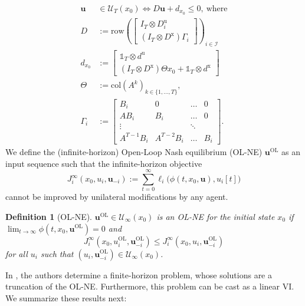 \documentclass[letterpaper, 10 pt, conference]{ieeeconf}  %
\newcommand{\mc}{\mathcal}
\newcommand{\bs}{\boldsymbol}
\newcommand{\col}{\mathrm{col}}
\newcommand{\buol}{\boldsymbol{u}^{\mathrm{OL}}}
\newcommand{\uol}{u^{\mathrm{OL}}}
\newcommand{\bu}{\boldsymbol{u}}
\newcommand{\Dx}{D^{\text{x}}}
\newcommand{\Du}{D^{\text{u}}}
\newcommand{\row}{\mathrm{row}}
\newtheorem{definition}{Definition}
\begin{document}
\begin{align}
    \bu&\in\mc U_T(x_0) \iff D\bu + d_{x_0} \leq 0, ~\text{where} \label{def-constraint1}\\ 
    D &:= 
        \row\left(\begin{bmatrix}
            I_T \otimes \Du_i \\
            (I_T\otimes\Dx)\Gamma_i
        \end{bmatrix}\right)_{i\in\mc I} \label{def-constraint2}\\ 
    d_{x_0} &:= \begin{bmatrix}
    \mathds{1}_{T} \otimes d^{\text{u}}\\
    (I_T\otimes \Dx)\Theta x_0 + \mathds{1}_{T} \otimes d^{\text{x}} \end{bmatrix}\label{def-constraint3}\\
    \Theta &:= \col(A^k)_{k\in\{1,...,T\}}, \label{def-constraint4}\\
    \Gamma_i &:= \begin{bmatrix}
            B_i & 0 & \dots & 0 \\
            A B_i & B_i & \dots & 0 \\
            \vdots &  & \ddots & \\
            A^{T-1}B_i & A^{T-2}B_i & \dots  &B_i
        \end{bmatrix}. \label{def-constraint5}
\end{align}
We define the (infinite-horizon) Open-Loop Nash equilibrium (OL-NE) $\buol$ as an input sequence such that the infinite-horizon objective
\begin{equation}
    J_i^\infty(x_0, u_i, \bs{u}_{-i}):= \sum_{t=0}^{\infty} \ell_i\big(\phi(t,x_0,\bu),u_i[t]\big)
\end{equation}
cannot be improved by unilateral modifications by any agent.
\begin{definition}[OL-NE] $\buol\in\mc{U}_{\infty}(x_0)$ is an OL-NE for the initial state $x_0$ if $\lim_{t\xrightarrow{}\infty} \phi(t,x_0,\buol)=0$ and
    \begin{equation}
        J_i^\infty(x_0, \uol_i, \buol_{-i})\leq J_i^\infty(x_0, u_i, \buol_{-i})
    \end{equation}
    for all $u_i$ such that $(u_i, \buol_{-i})\in\mc{U}_\infty(x_0)$.
\end{definition}
In \cite{benenati2024linear}, the authors determine a finite-horizon problem, whose solutions are a truncation of the OL-NE. Furthermore, this problem can be cast as a linear VI. We summarize these results next:
\end{document}
